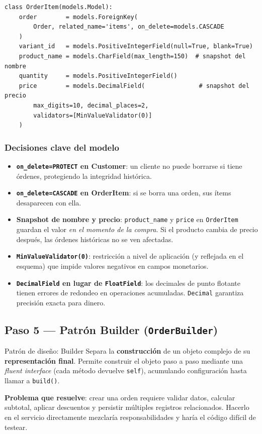 \documentclass[12pt, a4paper]{article}
\begin{document}
\begin{lstlisting}[caption={orders/models.py — modelo OrderItem}]
class OrderItem(models.Model):
    order        = models.ForeignKey(
        Order, related_name='items', on_delete=models.CASCADE
    )
    variant_id   = models.PositiveIntegerField(null=True, blank=True)
    product_name = models.CharField(max_length=150)  # snapshot del nombre
    quantity     = models.PositiveIntegerField()
    price        = models.DecimalField(               # snapshot del precio
        max_digits=10, decimal_places=2,
        validators=[MinValueValidator(0)]
    )
\end{lstlisting}

\subsubsection{Decisiones clave del modelo}

\begin{itemize}
    \item \textbf{\texttt{on\_delete=PROTECT} en Customer}: un cliente no puede borrarse si tiene órdenes, protegiendo la integridad histórica.
    \item \textbf{\texttt{on\_delete=CASCADE} en OrderItem}: si se borra una orden, sus ítems desaparecen con ella.
    \item \textbf{Snapshot de nombre y precio}: \texttt{product\_name} y \texttt{price} en \texttt{OrderItem} guardan el valor \textit{en el momento de la compra}. Si el producto cambia de precio después, las órdenes históricas no se ven afectadas.
    \item \textbf{\texttt{MinValueValidator(0)}}: restricción a nivel de aplicación (y reflejada en el esquema) que impide valores negativos en campos monetarios.
    \item \textbf{\texttt{DecimalField} en lugar de \texttt{FloatField}}: los decimales de punto flotante tienen errores de redondeo en operaciones acumuladas. \texttt{Decimal} garantiza precisión exacta para dinero.
\end{itemize}

\subsection{Paso 5 — Patrón Builder (\texttt{OrderBuilder})}

\begin{conceptbox}{Patrón de diseño: Builder}
Separa la \textbf{construcción} de un objeto complejo de su \textbf{representación final}. Permite construir el objeto paso a paso mediante una \textit{fluent interface} (cada método devuelve \texttt{self}), acumulando configuración hasta llamar a \texttt{build()}.

\textbf{Problema que resuelve}: crear una orden requiere validar datos, calcular subtotal, aplicar descuentos y persistir múltiples registros relacionados. Hacerlo en el servicio directamente mezclaría responsabilidades y haría el código difícil de testear.
\end{conceptbox}
\end{document}
